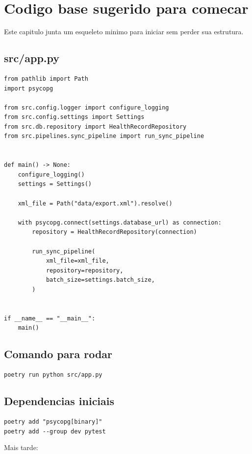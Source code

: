 \chapter{Codigo base sugerido para comecar}

Este capitulo junta um esqueleto minimo para iniciar sem perder sua estrutura.

\section{src/app.py}

\begin{lstlisting}[style=devbutterpython]
from pathlib import Path
import psycopg

from src.config.logger import configure_logging
from src.config.settings import Settings
from src.db.repository import HealthRecordRepository
from src.pipelines.sync_pipeline import run_sync_pipeline


def main() -> None:
    configure_logging()
    settings = Settings()

    xml_file = Path("data/export.xml").resolve()

    with psycopg.connect(settings.database_url) as connection:
        repository = HealthRecordRepository(connection)

        run_sync_pipeline(
            xml_file=xml_file,
            repository=repository,
            batch_size=settings.batch_size,
        )


if __name__ == "__main__":
    main()
\end{lstlisting}

\section{Comando para rodar}

\begin{lstlisting}[style=devbutterbash]
poetry run python src/app.py
\end{lstlisting}

\section{Dependencias iniciais}

\begin{lstlisting}[style=devbutterbash]
poetry add "psycopg[binary]"
poetry add --group dev pytest
\end{lstlisting}

Mais tarde:

